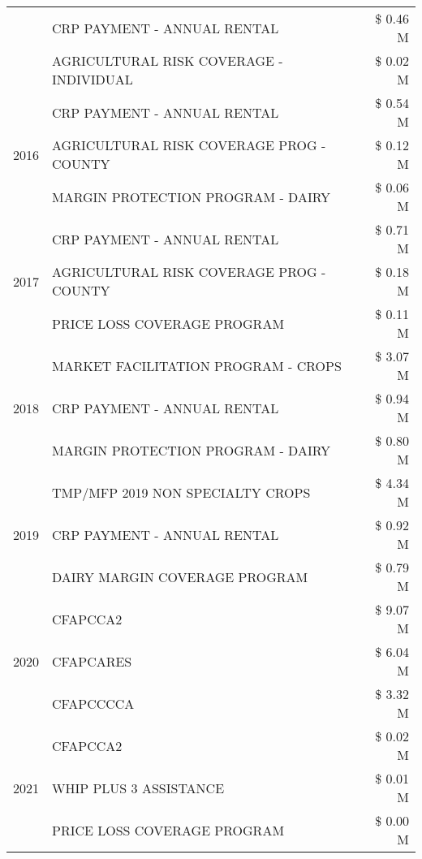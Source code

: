 \begin{tabular}{llr}
 & CRP PAYMENT - ANNUAL RENTAL & \$ 0.46 M \\
 & AGRICULTURAL RISK COVERAGE - INDIVIDUAL & \$ 0.02 M \\
\cline{1-3}
\multirow[t]{3}{*}{2016} & CRP PAYMENT - ANNUAL RENTAL & \$ 0.54 M \\
 & AGRICULTURAL RISK COVERAGE PROG - COUNTY & \$ 0.12 M \\
 & MARGIN PROTECTION PROGRAM - DAIRY & \$ 0.06 M \\
\cline{1-3}
\multirow[t]{3}{*}{2017} & CRP PAYMENT - ANNUAL RENTAL & \$ 0.71 M \\
 & AGRICULTURAL RISK COVERAGE PROG - COUNTY & \$ 0.18 M \\
 & PRICE LOSS COVERAGE PROGRAM & \$ 0.11 M \\
\cline{1-3}
\multirow[t]{3}{*}{2018} & MARKET FACILITATION PROGRAM - CROPS & \$ 3.07 M \\
 & CRP PAYMENT - ANNUAL RENTAL & \$ 0.94 M \\
 & MARGIN PROTECTION PROGRAM - DAIRY & \$ 0.80 M \\
\cline{1-3}
\multirow[t]{3}{*}{2019} & TMP/MFP 2019 NON SPECIALTY CROPS & \$ 4.34 M \\
 & CRP PAYMENT - ANNUAL RENTAL & \$ 0.92 M \\
 & DAIRY MARGIN COVERAGE PROGRAM & \$ 0.79 M \\
\cline{1-3}
\multirow[t]{3}{*}{2020} & CFAPCCA2 & \$ 9.07 M \\
 & CFAPCARES & \$ 6.04 M \\
 & CFAPCCCCA & \$ 3.32 M \\
\cline{1-3}
\multirow[t]{3}{*}{2021} & CFAPCCA2 & \$ 0.02 M \\
 & WHIP PLUS 3 ASSISTANCE & \$ 0.01 M \\
 & PRICE LOSS COVERAGE PROGRAM & \$ 0.00 M \\
\cline{1-3}
\bottomrule
\end{tabular}
